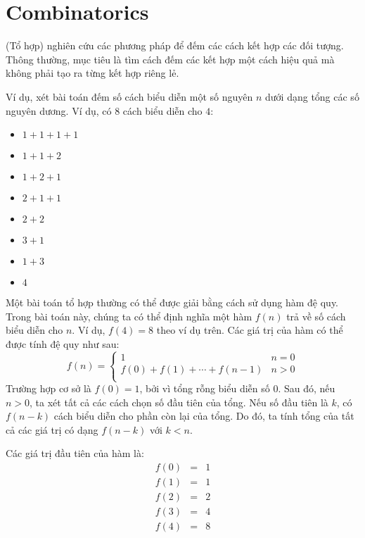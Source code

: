 \chapter{Combinatorics}


 (Tổ hợp) nghiên cứu các phương pháp để đếm
các cách kết hợp các đối tượng.
Thông thường, mục tiêu là tìm cách
đếm các kết hợp một cách hiệu quả
mà không phải tạo ra từng kết hợp riêng lẻ.

Ví dụ, xét bài toán
đếm số cách
biểu diễn một số nguyên $n$ dưới dạng tổng các số nguyên dương.
Ví dụ, có 8 cách biểu diễn
cho $4$:
\begin{multicols}{2}
\begin{itemize}
\item $1+1+1+1$
\item $1+1+2$
\item $1+2+1$
\item $2+1+1$
\item $2+2$
\item $3+1$
\item $1+3$
\item $4$
\end{itemize}
\end{multicols}

Một bài toán tổ hợp thường có thể được giải
bằng cách sử dụng hàm đệ quy.
Trong bài toán này, chúng ta có thể định nghĩa một hàm $f(n)$
trả về số cách biểu diễn cho $n$.
Ví dụ, $f(4)=8$ theo ví dụ trên.
Các giá trị của hàm
có thể được tính đệ quy như sau:
\begin{equation*}
    f(n) = \begin{cases}
               1               & n = 0\\
               f(0)+f(1)+\cdots+f(n-1) & n > 0\\
           \end{cases}
\end{equation*}
Trường hợp cơ sở là $f(0)=1$,
bởi vì tổng rỗng biểu diễn số 0.
Sau đó, nếu $n>0$, ta xét tất cả các cách
chọn số đầu tiên của tổng.
Nếu số đầu tiên là $k$,
có $f(n-k)$ cách biểu diễn
cho phần còn lại của tổng.
Do đó, ta tính tổng của tất cả các giá trị
có dạng $f(n-k)$ với $k<n$.

Các giá trị đầu tiên của hàm là:
\[
\begin{array}{lcl}
f(0) & = & 1 \\
f(1) & = & 1 \\
f(2) & = & 2 \\
f(3) & = & 4 \\
f(4) & = & 8 \\
\end{array}
\]

